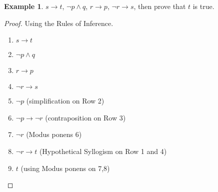 \documentclass[11pt]{article}
\theoremstyle{definition}
\newtheorem{eg}{Example}
\begin{document}
\begin{eg}
$s \rightarrow t$, $\neg p \land q$, $r \rightarrow p$, $\neg r \rightarrow s$, then prove that $t$ is true. 

\begin{proof}
Using the Rules of Inference. 
\begin{enumerate}
\item $s \rightarrow t$
\item $\neg p \land q$
\item $r \rightarrow p$
\item $\neg r \rightarrow s$
\item $\neg p$ (simplification on Row 2)
\item $\neg p \rightarrow \neg r$ (contraposition on Row 3)
\item $\neg r$ (Modus ponens 6)
\item $\neg r \rightarrow t$ (Hypothetical Syllogism on Row 1 and 4)
\item $t$ (using Modus ponens on 7,8)
\end{enumerate}
\end{proof}
\end{eg}
\end{document}

